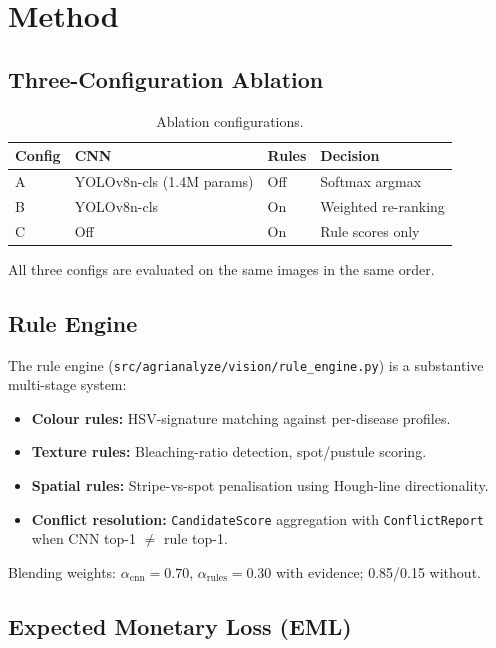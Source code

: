 \documentclass[runningheads]{llncs}
\begin{document}
\section{Method}

\subsection{Three-Configuration Ablation}

\begin{table}[h]
\centering
\caption{Ablation configurations.}
\label{tab:configs}
\begin{tabular}{@{}llll@{}}
\toprule
Config & CNN & Rules & Decision \\
\midrule
A & YOLOv8n-cls (1.4M params) & Off  & Softmax argmax \\
B & YOLOv8n-cls               & On   & Weighted re-ranking \\
C & Off                        & On   & Rule scores only \\
\bottomrule
\end{tabular}
\end{table}

\noindent All three configs are evaluated on the same images in the same order.

\subsection{Rule Engine}

The rule engine (\texttt{src/agrianalyze/vision/rule\_engine.py}) is a
substantive multi-stage system:
\begin{itemize}
  \item \textbf{Colour rules:} HSV-signature matching against per-disease profiles.
  \item \textbf{Texture rules:} Bleaching-ratio detection, spot/pustule scoring.
  \item \textbf{Spatial rules:} Stripe-vs-spot penalisation using Hough-line directionality.
  \item \textbf{Conflict resolution:} \texttt{CandidateScore} aggregation with
        \texttt{ConflictReport} when CNN top-1 $\neq$ rule top-1.
\end{itemize}

Blending weights: $\alpha_{\text{cnn}}=0.70$, $\alpha_{\text{rules}}=0.30$
with evidence; 0.85/0.15 without.

\subsection{Expected Monetary Loss (EML)}
\end{document}
